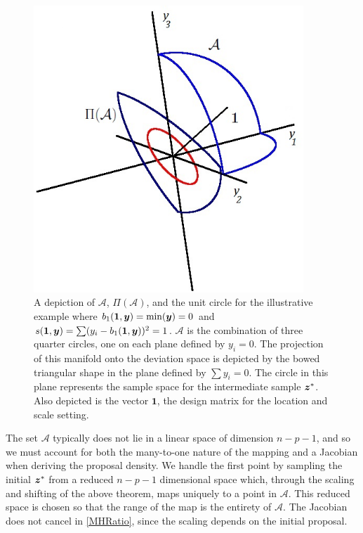 \documentclass[12pt]{article}
\newcommand{\by}{\mbox{\boldmath $y$}}
\newcommand{\bz}{\mbox{\boldmath $z$}}
\newcommand{\green}[1]{{\color{green}#1}}
\begin{document}
\begin{figure}[t]
\centering
\includegraphics[width=4in]{minSS3dSampleSpace.jpg}
\caption{A depiction of $\mathcal{A}$, $\Pi(\mathcal{A})$, and the
  unit circle for the illustrative example where $b_{1}(\mathbf{1},\by)=\min(\by)=0$ and
  $s(\mathbf{1},\by)=\sum (y_i -b_{1}(\mathbf{1},\by))^2 =1$.
$\mathcal{A}$ is the combination of three quarter circles, one
  on each plane defined by $y_i=0$. The projection of this manifold
  onto the deviation space is depicted by the bowed triangular shape
  in the plane defined by $\sum y_i=0$. The circle in this plane
  represents the sample space for the intermediate sample \green{$\bz^*$}. Also
  depicted is the vector $\mathbf{1}$, the design matrix for the
  location and scale setting.}
\label{fig:sampSpace}
\end{figure}

The set $\mathcal{A}$ typically does not lie in a linear space of dimension $n - p - 1$, and 
so we must account for both the many-to-one nature of the mapping and
a Jacobian when deriving the proposal density.  We handle the first
point by sampling the initial $\bz^*$ from
 a reduced $n - p - 1$ dimensional space which, through the scaling and
shifting of the above theorem, maps uniquely to a point 
in $\mathcal{A}$. This reduced space is chosen so that the range of the map is the
entirety of $\mathcal{A}$.  The Jacobian does not cancel in
\eqref{MHRatio}, since the scaling depends on the initial proposal. 
\end{document}

